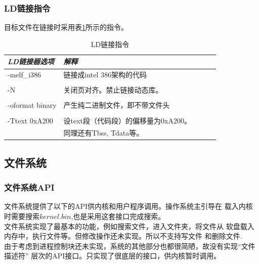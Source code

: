 \documentclass[a4paper]{article}
\begin{document}
    \subsubsection{LD链接指令}\label{subsec:LDIns}
    目标文件在链接时采用表\ref{tab:ld}所示的指令。
    \begin{table}[!hbt]
        \caption{LD链接指令}\label{tab:ld}
    \begin{tabular}{@{} *5l @{}}    
        \toprule
    \emph{LD链接器选项} & \emph{解释} &&&  \\
        \midrule
        -melf\_i386    & 链接成intel 386架构的代码 \\ 
        \\ 
        -N & 关闭页对齐。禁止链接动态库。\\
        \\
        -oformat binary & 产生纯二进制文件，即不带文件头 \\
        \\
        -Ttext 0xA200 & 设text段（代码段）的偏移量为0xA200。
            \\& 同理还有Tbss, Tdata等。 \\
        \bottomrule
    \hline
    \end{tabular}
    \end{table}

    \subsection{文件系统} \label{sec:fsapi}
    \subsubsection{文件系统API}
    文件系统提供了以下的API供内核和用户程序调用。操作系统主引导在
    载入内核时需要搜索$kernel.bin$,也是采用这套接口完成搜索。\\

    文件系统实现了最基本的功能，例如搜索文件，进入文件夹，将文件从
    软盘载入内存中，执行文件等。但修改操作还未实现。所以不支持写文件
    和删除文件.\\ 

    由于考虑到进程控制块还未实现，系统的其他部分也都很简陋，故没有实现``文件描述符''
    层次的API接口。只实现了很底层的接口，供内核暂时调用。\\
    
\end{document}
